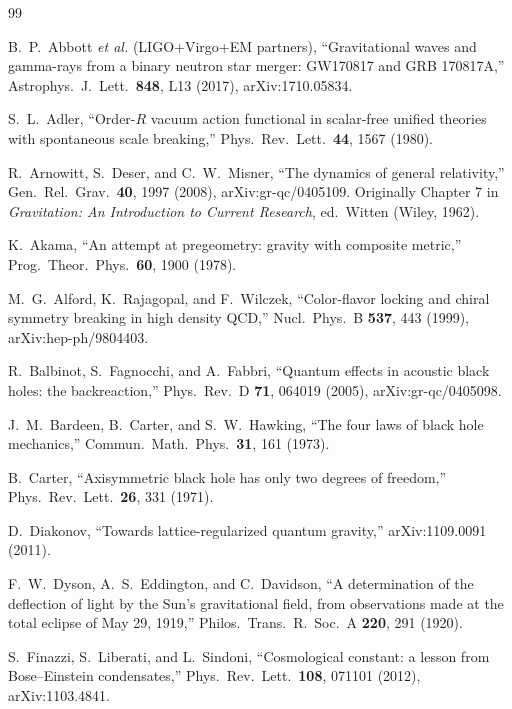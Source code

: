 \documentclass[aps,prd,nofootinbib,superscriptaddress,12pt]{revtex4-2}
\begin{document}
\begin{thebibliography}{99}

B.~P.~Abbott \emph{et al.} (LIGO+Virgo+EM partners),
``Gravitational waves and gamma-rays from a binary neutron star merger:
GW170817 and GRB 170817A,''
Astrophys.\ J.\ Lett.\ \textbf{848}, L13 (2017),
arXiv:1710.05834.

S.~L.~Adler,
``Order-$R$ vacuum action functional in scalar-free unified theories
with spontaneous scale breaking,''
Phys.\ Rev.\ Lett.\ \textbf{44}, 1567 (1980).

R.~Arnowitt, S.~Deser, and C.~W.~Misner,
``The dynamics of general relativity,''
Gen.\ Rel.\ Grav.\ \textbf{40}, 1997 (2008),
arXiv:gr-qc/0405109. Originally Chapter 7 in
\emph{Gravitation: An Introduction to Current Research}, ed.\ Witten
(Wiley, 1962).

K.~Akama,
``An attempt at pregeometry: gravity with composite metric,''
Prog.\ Theor.\ Phys.\ \textbf{60}, 1900 (1978).

M.~G.~Alford, K.~Rajagopal, and F.~Wilczek,
``Color-flavor locking and chiral symmetry breaking in high density QCD,''
Nucl.\ Phys.\ B \textbf{537}, 443 (1999),
arXiv:hep-ph/9804403.

R.~Balbinot, S.~Fagnocchi, and A.~Fabbri,
``Quantum effects in acoustic black holes: the backreaction,''
Phys.\ Rev.\ D \textbf{71}, 064019 (2005),
arXiv:gr-qc/0405098.

J.~M.~Bardeen, B.~Carter, and S.~W.~Hawking,
``The four laws of black hole mechanics,''
Commun.\ Math.\ Phys.\ \textbf{31}, 161 (1973).

B.~Carter,
``Axisymmetric black hole has only two degrees of freedom,''
Phys.\ Rev.\ Lett.\ \textbf{26}, 331 (1971).

D.~Diakonov,
``Towards lattice-regularized quantum gravity,''
arXiv:1109.0091 (2011).

F.~W.~Dyson, A.~S.~Eddington, and C.~Davidson,
``A determination of the deflection of light by the Sun's gravitational
field, from observations made at the total eclipse of May 29, 1919,''
Philos.\ Trans.\ R.\ Soc.\ A \textbf{220}, 291 (1920).

S.~Finazzi, S.~Liberati, and L.~Sindoni,
``Cosmological constant: a lesson from Bose--Einstein condensates,''
Phys.\ Rev.\ Lett.\ \textbf{108}, 071101 (2012),
arXiv:1103.4841.


\end{thebibliography}
\end{document}
